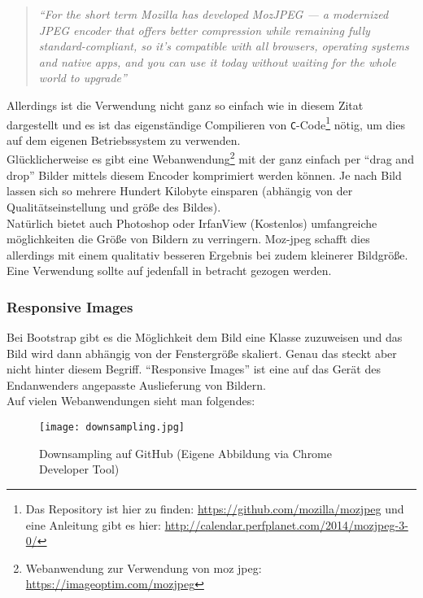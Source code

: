 			\begin{quote}
				\textit{"`For the short term Mozilla has developed MozJPEG — a modernized JPEG encoder that offers better compression while remaining fully standard-compliant, so it’s compatible with all browsers, operating systems and native apps, and you can use it today without waiting for the whole world to upgrade"'\autocite{mozJPEG}}
			\end{quote}

			Allerdings ist die Verwendung nicht ganz so einfach wie in diesem Zitat dargestellt und es ist das eigenständige Compilieren von \texttt{C}-Code\footnote{Das Repository ist hier zu finden: \url{https://github.com/mozilla/mozjpeg} und eine Anleitung gibt es hier: \url{http://calendar.perfplanet.com/2014/mozjpeg-3-0/}} nötig, um dies auf dem eigenen Betriebssystem zu verwenden.\\
			Glücklicherweise es gibt eine Webanwendung\footnote{Webanwendung zur Verwendung von moz jpeg: \url{https://imageoptim.com/mozjpeg}} mit der ganz einfach per "`drag and drop"' Bilder mittels diesem Encoder komprimiert werden können. Je nach Bild lassen sich so mehrere Hundert Kilobyte einsparen (abhängig von der Qualitätseinstellung und größe des Bildes).\\

			Natürlich bietet auch Photoshop oder IrfanView (Kostenlos) umfangreiche möglichkeiten die Größe von Bildern zu verringern. Moz-jpeg schafft dies allerdings mit einem qualitativ besseren Ergebnis bei zudem kleinerer Bildgröße. Eine Verwendung sollte auf jedenfall in betracht gezogen werden.


		\subsubsection{Responsive Images} %
		\label{ssub:responsive_images}
			Bei Bootstrap gibt es die Möglichkeit dem Bild eine Klasse zuzuweisen und das Bild wird dann abhängig von der Fenstergröße skaliert. Genau das steckt aber nicht hinter diesem Begriff. "`Responsive Images"' ist eine auf das Gerät des Endanwenders angepasste Auslieferung von Bildern.\\
			Auf vielen Webanwendungen sieht man folgendes:

			\begin{figure}[htbp]
				\begin{center}
					\texttt{[image: downsampling.jpg]}
					\caption{Downsampling auf GitHub (Eigene Abbildung via Chrome Developer Tool)}
					\label{fig:downsampling}
				\end{center}
			\end{figure}

